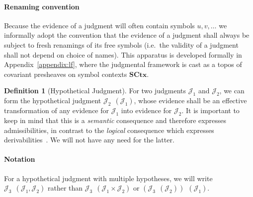 \documentclass[11pt]{article}
\theoremstyle{definition}
\newtheorem{definition}[thm]{Definition}
\theoremstyle{remark}
\numberwithin{equation}{section}
\newcommand\HypJ[2]{#1\ \ \left(#2\right)}
\newcommand\SCtx{\mathbf{SCtx}}
\begin{document}
\paragraph{Renaming convention} Because the evidence of a judgment will often
contain symbols $u,v,\dots$ we informally adopt the convention that the
evidence of a judgment shall always be subject to fresh renamings of its free
symbols (i.e.\ the validity of a judgment shall not depend on choice of names).
This apparatus is developed formally in Appendix~\ref{appendix:lf}, where the
judgmental framework is cast as a topos of covariant presheaves on symbol contexts
$\SCtx$.

\begin{definition}[Hypothetical Judgment]
  For two judgments $\mathcal{J}_1$ and $\mathcal{J}_2$, we can form the
  hypothetical judgment $\HypJ{\mathcal{J}_2}{\mathcal{J}_1}$, whose evidence
  shall be an effective transformation of any evidence for $\mathcal{J}_1$ into
  evidence for $\mathcal{J}_2$. It is important to keep in mind that this is a
  \emph{semantic} consequence and therefore expresses admissibilities, in
  contrast to the \emph{logical} consequence which expresses
  derivabilities~\cite{harper:2016}. We will not have any need for the latter.

  \paragraph{Notation}
  For a hypothetical judgment with multiple hypotheses, we will write
  $\HypJ{\mathcal{J}_3}{\mathcal{J}_1, \mathcal{J}_2}$ rather than
  $\HypJ{\mathcal{J}_3}{\mathcal{J}_1\times\mathcal{J}_2}$ or
  $\HypJ{(\HypJ{\mathcal{J}_3}{\mathcal{J}_2})}{\mathcal{J}_1}$.
\end{definition}
\end{document}
